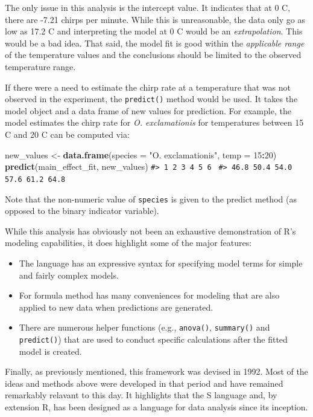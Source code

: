 \documentclass[11pt]{book}
\newenvironment{Shaded}{\begin{snugshade}}{\end{snugshade}}
\newcommand{\CommentTok}[1]{\textcolor[rgb]{0.56,0.35,0.01}{\textit{#1}}}
\newcommand{\DataTypeTok}[1]{\textcolor[rgb]{0.13,0.29,0.53}{#1}}
\newcommand{\DecValTok}[1]{\textcolor[rgb]{0.00,0.00,0.81}{#1}}
\newcommand{\KeywordTok}[1]{\textcolor[rgb]{0.13,0.29,0.53}{\textbf{#1}}}
\newcommand{\NormalTok}[1]{#1}
\newcommand{\OperatorTok}[1]{\textcolor[rgb]{0.81,0.36,0.00}{\textbf{#1}}}
\newcommand{\StringTok}[1]{\textcolor[rgb]{0.31,0.60,0.02}{#1}}
\renewcommand{\CommentTok}[1]{\textcolor[rgb]{0.41,0.41,0.41}{\texttt{#1}}}
\begin{document}
The only issue in this analysis is the intercept value. It indicates that at 0 C, there are -7.21 chirps per minute. While this is unreasonable, the data only go as low as 17.2 C and interpreting the model at 0 C would be an \emph{extrapolation}. This would be a bad idea. That said, the model fit is good within the \emph{applicable range} of the temperature values and the conclusions should be limited to the observed temperature range.

If there were a need to estimate the chirp rate at a temperature that was not observed in the experiment, the \texttt{predict()} method would be used. It takes the model object and a data frame of new values for prediction. For example, the model estimates the chirp rate for \emph{O. exclamationis} for temperatures between 15 C and 20 C can be computed via:

\begin{Shaded}
\begin{Highlighting}[]
\NormalTok{new_values <-}\StringTok{ }\KeywordTok{data.frame}\NormalTok{(}\DataTypeTok{species =} \StringTok{"O. exclamationis"}\NormalTok{, }\DataTypeTok{temp =} \DecValTok{15}\OperatorTok{:}\DecValTok{20}\NormalTok{)}
\KeywordTok{predict}\NormalTok{(main_effect_fit, new_values)}
\CommentTok{#>    1    2    3    4    5    6 }
\CommentTok{#> 46.8 50.4 54.0 57.6 61.2 64.8}
\end{Highlighting}
\end{Shaded}

Note that the non-numeric value of \texttt{species} is given to the predict method (as opposed to the binary indicator variable).

While this analysis has obviously not been an exhaustive demonstration of R's modeling capabilities, it does highlight some of the major features:

\begin{itemize}
\item
  The language has an expressive syntax for specifying model terms for simple and fairly complex models.
\item
  For formula method has many conveniences for modeling that are also applied to new data when predictions are generated.
\item
  There are numerous helper functions (e.g., \texttt{anova()}, \texttt{summary()} and \texttt{predict()}) that are used to conduct specific calculations after the fitted model is created.
\end{itemize}

Finally, as previously mentioned, this framework was devised in 1992. Most of the ideas and methods above were developed in that period and have remained remarkably relavant to this day. It highlights that the S language and, by extension R, has been designed as a language for data analysis since its inception.
\end{document}

